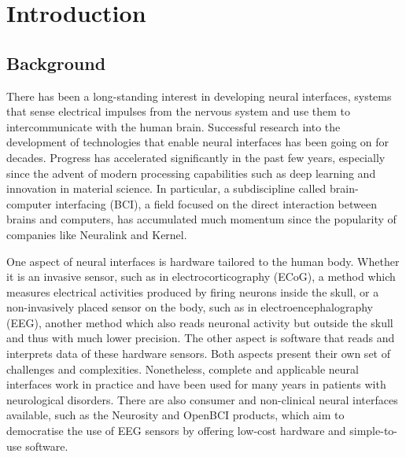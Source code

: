 \chapter{Introduction}

\section{Background}
\label{chapter1-background}

There has been a long-standing interest in developing neural interfaces, systems that sense electrical impulses from the nervous system and use them to intercommunicate with the human brain. Successful research into the development of technologies that enable neural interfaces has been going on for decades. Progress has accelerated significantly in the past few years, especially since the advent of modern processing capabilities such as deep learning and innovation in material science. In particular, a subdiscipline called brain-computer interfacing (BCI), a field focused on the direct interaction between brains and computers, has accumulated much momentum since the popularity of companies like Neuralink and Kernel.

One aspect of neural interfaces is hardware tailored to the human body. Whether it is an invasive sensor, such as in electrocorticography (ECoG), a method which measures electrical activities produced by firing neurons inside the skull, or a non-invasively placed sensor on the body, such as in electroencephalography (EEG), another method which also reads neuronal activity but outside the skull and thus with much lower precision. The other aspect is software that reads and interprets data of these hardware sensors. Both aspects present their own set of challenges and complexities. Nonetheless, complete and applicable neural interfaces work in practice and have been used for many years in patients with neurological disorders. There are also consumer and non-clinical neural interfaces available, such as the Neurosity and OpenBCI products, which aim to democratise the use of EEG sensors by offering low-cost hardware and simple-to-use software.



